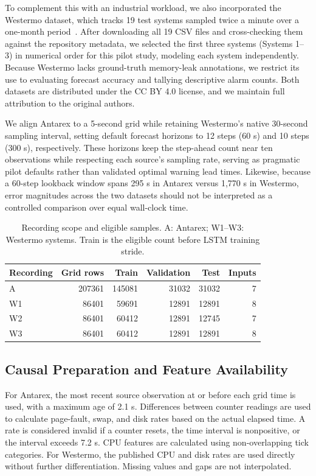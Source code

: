 \documentclass{llncs}
\begin{document}
To complement this with an industrial workload, we also incorporated the Westermo dataset, which tracks 19 test systems sampled twice a minute over a one-month period~\cite{ref6}. After downloading all 19 CSV files and cross-checking them against the repository metadata, we selected the first three systems (Systems 1--3) in numerical order for this pilot study, modeling each system independently. Because Westermo lacks ground-truth memory-leak annotations, we restrict its use to evaluating forecast accuracy and tallying descriptive alarm counts. Both datasets are distributed under the CC BY 4.0 license, and we maintain full attribution to the original authors.

We align Antarex to a 5-second grid while retaining Westermo's native 30-second sampling interval, setting default forecast horizons to 12 steps (60 s) and 10 steps (300 s), respectively. These horizons keep the step-ahead count near ten observations while respecting each source's sampling rate, serving as pragmatic pilot defaults rather than validated optimal warning lead times. Likewise, because a 60-step lookback window spans 295 s in Antarex versus 1,770 s in Westermo, error magnitudes across the two datasets should not be interpreted as a controlled comparison over equal wall-clock time.

\begin{table}[htbp]
\caption{Recording scope and eligible samples. A: Antarex; W1--W3: Westermo systems. Train is the eligible count before LSTM training stride.}
\label{tab:data}
\centering\small
\setlength{\tabcolsep}{5pt}
\begin{tabular}{@{}lrrrrr@{}}
\toprule
Recording & Grid rows & Train & Validation & Test & Inputs\\
\midrule
A &207361&145081&31032&31032&7\\
W1&86401&59691&12891&12891&8\\
W2&86401&60412&12891&12745&7\\
W3&86401&60412&12891&12891&8\\
\bottomrule
\end{tabular}
\end{table}

\subsection{Causal Preparation and Feature Availability}
For Antarex, the most recent source observation at or before each grid time is used, with a maximum age of 2.1 s. Differences between counter readings are used to calculate page-fault, swap, and disk rates based on the actual elapsed time. A rate is considered invalid if a counter resets, the time interval is nonpositive, or the interval exceeds 7.2 s. CPU features are calculated using non-overlapping tick categories. For Westermo, the published CPU and disk rates are used directly without further differentiation. Missing values and gaps are not interpolated.
\end{document}
